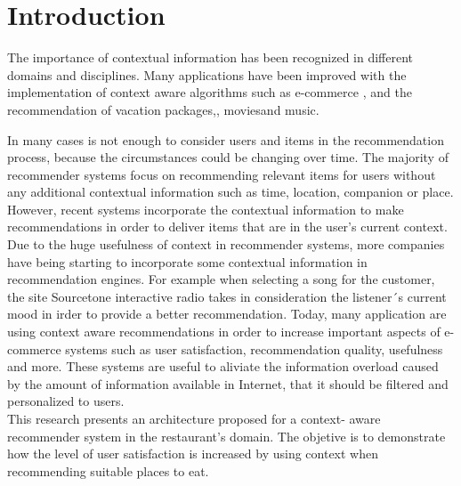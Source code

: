 \section{Introduction} \label{intro} 

The importance of contextual information has been recognized in different
domains and disciplines.  Many applications have been improved with the %
implementation of context aware algorithms such as e-commerce
\cite{bulander2005enabling},\cite{schafer1999recommender} and the recommendation of vacation
packages,\cite{liu2011personalized},\cite{liu2014cocktail}
movies\cite{eyjolfsdottir2010moviegen}and music\cite{baltrunas2011incarmusic}.

In many cases is not enough to consider users and items in the recommendation process, because
the circumstances could be changing over time. The majority of recommender systems %
focus on recommending relevant items for users without any additional contextual
information such as time, location, companion or place. However, recent systems 
incorporate the contextual information to make recommendations in order to
deliver items that are in the user's current context. \\   

Due to the huge usefulness of %
context in recommender systems, more companies have being starting to incorporate some
contextual information in recommendation engines.  For example when selecting a
song for the customer, the site Sourcetone interactive radio \cite{huq2010automated} takes
in consideration the listener´s current mood in irder to provide a better recommendation.
Today, many application are
using context aware recommendations in order to increase important aspects
of e-commerce systems such as user satisfaction,
recommendation quality, usefulness and more. These systems are useful to aliviate the
information overload caused by the amount of
information available in Internet, that it should be filtered and personalized
to users.\\  This research presents an architecture proposed for a context-
aware recommender system in the restaurant's domain. The objetive is to
demonstrate how the level of user satisfaction is increased by using context when 
recommending suitable places to eat.


